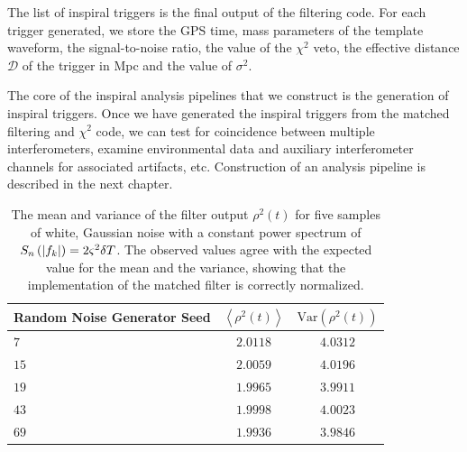 The list of inspiral triggers is the final output of the filtering code. For
each trigger generated, we store the GPS time, mass parameters of the
template waveform, the signal-to-noise ratio, the value of the $\chi^2$ veto, the
effective distance $\mathcal{D}$ of the trigger in Mpc and the value of
$\sigma^2$.

The core of the inspiral analysis pipelines that we construct is the generation of
inspiral triggers. Once we have generated the inspiral triggers from the
matched filtering and $\chi^2$ code, we can test for coincidence
between multiple interferometers, examine environmental data and auxiliary
interferometer channels for associated artifacts, etc.  Construction of an
analysis pipeline is described in the next chapter.


\begin{table}[p]
\begin{center}
\begin{tabular}{l|c|c}
Random Noise Generator Seed& $\left\langle \rho^2(t) \right\rangle$ & $\mathrm{Var}( \rho^2(t) )$\\
\hline
$7$ & $2.0118$ & $4.0312$ \\
$15$ & $2.0059$ & $4.0196$ \\
$19$ & $1.9965$ & $3.9911$ \\
$43$ & $1.9998$ & $4.0023$ \\
$69$ & $1.9936$ & $3.9846$ \\
\end{tabular}
\end{center}
\caption[Mean and Variance of the Matched Filter Output for Gaussian Noise]{%
\label{t:normresults}
The mean and variance of the filter output $\rho^2(t)$ for five samples of
white, Gaussian noise with a constant power spectrum of $S_n\left(\left|f_{k}\right|\right) =
2\varsigma^2\delta T$. The observed values agree with the expected value for the
mean and the variance, showing that the implementation of the matched
filter is correctly normalized.
}
\end{table}

\newpage

